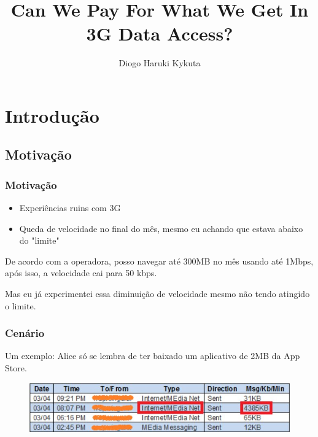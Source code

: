\documentclass[brazil]{beamer}
\title{Can We Pay For What We Get In 3G Data Access?}
\author{Diogo Haruki Kykuta}
\date{}
\begin{document}
\frame{\titlepage}

\section{Introdução}



\subsection{Motivação}

\begin{frame}[fragile]
    \frametitle{Motivação}
    \begin{itemize}
        \item Experiências ruins com 3G
        \item Queda de velocidade no final do mês, mesmo eu achando que estava abaixo do "limite"
    \end{itemize}
\end{frame}

\begin{frame}[fragile]
    De acordo com a operadora, posso navegar até 300MB no mês usando até 1Mbps, após isso, a velocidade cai
    para 50 kbps.

    \pause
    \vspace{0.4cm}
    Mas eu já experimentei essa diminuição de velocidade mesmo não tendo atingido o limite.
\end{frame}

\begin{frame}[fragile]
    \frametitle{Cenário}
    Um exemplo: Alice só se lembra de ter baixado um aplicativo de 2MB da App Store.

    \begin{figure}
    \begin{center}
        \includegraphics[scale=0.5]{images/contaAlice.jpg}
    \end{center}
    \end{figure}
\end{frame}
\end{document}
